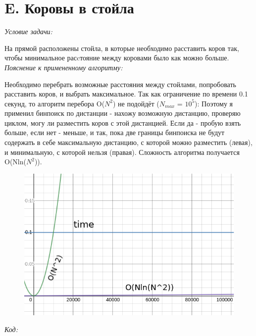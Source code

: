 \section{E. Коровы в стойла}
\textit{Условие задачи:} \par
На прямой расположены стойла, в которые необходимо расставить коров так, чтобы минимальное расcтояние между коровами было как можно больше.\\
\textit{Пояснение к примененному алгоритму:} \par
Необходимо перебрать возможные расстояния между стойлами, попробовать расставить коров, и выбрать максимальное.
Так как ограничение по времени 0.1 секунд, то алгоритм перебора O($N^2$) не подойдёт ($N_{max}$ = $10^5$):
Поэтому я применил бинпоиск по дистанции - нахожу возможную дистанцию, проверяю циклом, могу ли разместить коров с этой дистанцией.
Если да - пробую взять больше, если нет - меньше, и так, пока две границы бинпоиска не будут содержать в себе максимальную дистанцию,
с которой можно разместить (левая), и минимальную, с которой нельзя (правая).
Сложность алгоритма получается O(Nln($N^2$)).
\begin{figure}[H]
    \centering
    \includegraphics[scale=0.4]{img/saveaspng}
\end{figure}
\BgThispage
\newpage
\textit{Код:}
\small
